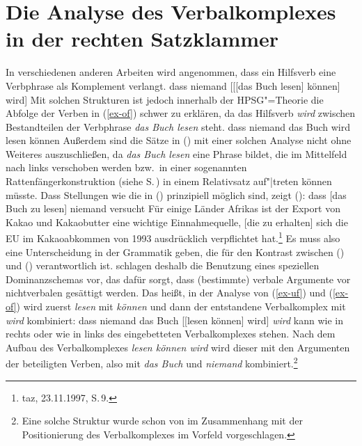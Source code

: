 \section{Die Analyse des Verbalkomplexes in der rechten Satzklammer}
\label{sec-verbalkomplex}

In verschiedenen anderen Arbeiten \citep[z.\,B.][Kapitel~3]{Uszkoreit87a} 
wird angenommen, dass ein Hilfsverb eine Verbphrase als Komplement verlangt. 
\ea
\label{ex-uf}
dass niemand [[[das Buch lesen] können] wird]
\z
Mit solchen Strukturen ist jedoch innerhalb der HPSG"=Theorie
die Abfolge der Verben in (\ref{ex-of}) schwer zu erklären,
da das Hilfsverb \emph{wird} zwischen Bestandteilen der Verbphrase \emph{das Buch lesen} steht.
\ea
\label{ex-of}
dass niemand das Buch wird lesen können
\z
Außerdem sind die Sätze in () mit einer solchen Analyse nicht ohne Weiteres auszuschließen,
da \emph{das Buch lesen} eine Phrase bildet, die im Mittelfeld nach links verschoben
werden bzw.\ in einer sogenannten Rattenfängerkonstruktion (siehe S.\,\pageref{page-rattenfaenger})
in einem Relativsatz auf"|treten können müsste.
\eal
{}
\zl
Dass Stellungen wie die in () prinzipiell möglich sind, zeigt ():
\eal
\ex dass [das Buch zu lesen] niemand versucht
\ex Für einige Länder Afrikas ist der Export von Kakao und Kakaobutter eine wichtige
    Einnahmequelle, [die zu erhalten] sich die EU im Kakaoabkommen von 1993 ausdrücklich
    verpflichtet hat.\footnote{
        taz, 23.11.1997, S.\,9.
}
\zl
Es muss also eine Unterscheidung in der Grammatik geben, die für den Kontrast
zwischen () und () verantwortlich ist.
\citet*{HN94a} schlagen deshalb die Benutzung eines speziellen Dominanzschemas vor, 
das dafür sorgt, dass (bestimmte) verbale Argumente vor nichtverbalen gesättigt werden. Das heißt,
in der Analyse von (\ref{ex-uf}) und (\ref{ex-of}) wird zuerst \emph{lesen} mit \emph{können}
und dann der entstandene Verbalkomplex mit \emph{wird} kombiniert:
\ea
\label{ex-struktur-lesen-koennen-wird}
dass niemand das Buch [[lesen können] wird]
\z
\emph{wird} kann wie in  rechts oder wie in  links des eingebetteten Verbalkomplexes
stehen. Nach dem Aufbau des Verbalkomplexes \emph{lesen können wird} wird dieser mit den Argumenten 
der beteiligten Verben, also mit \emph{das Buch} und \emph{niemand} kombiniert.\footnote{
        Eine solche Struktur wurde schon von \citet*{Johnson86a}
        im Zusammenhang mit der Positionierung des Verbalkomplexes im
        Vorfeld vorgeschlagen.
}

